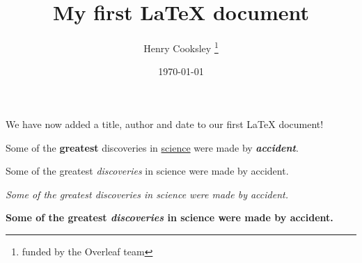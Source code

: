 \documentclass[12pt, a4paper]{article}
\title{My first \LaTeX{} document}
\author{Henry Cooksley \thanks{funded by the Overleaf team}}
\date{\today}
\begin{document}
\maketitle

We have now added a title, author and date to our first \LaTeX{} document!


Some of the \textbf{greatest}
discoveries in \underline{science}
were made by \textbf{\textit{accident}}.

Some of the greatest \emph{discoveries}
in science
were made by accident.

\textit{Some of the greatest \emph{discoveries} 
in science 
were made by accident.}

\textbf{Some of the greatest \emph{discoveries} 
in science 
were made by accident.}
\end{document}
